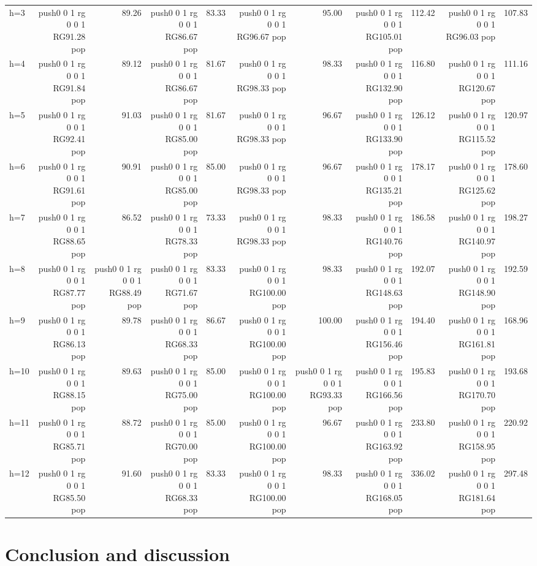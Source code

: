 \documentclass[
  american,
  12pt]{article}
\theoremstyle{plain}
\theoremstyle{plain}
\theoremstyle{remark}
\newcommand{\CPTSadd}[1]{\ifmmode\else\leavevmode\fi\pdfcolorstack 0 push{0 0 1 rg 0 0 1 RG}#1\pdfcolorstack 0 pop}
\begin{document}
\begin{table}
{{\begin{tabular}{lrrrrrrrrrr}
h=3  & \CPTSadd{91.28} & 89.26 & \CPTSadd{86.67} & 83.33 & \CPTSadd{96.67} & 95.00 & \CPTSadd{105.01} & 112.42 & \CPTSadd{96.03} & 107.83 \\
h=4  & \CPTSadd{91.84} & 89.12 & \CPTSadd{86.67} & 81.67 & \CPTSadd{98.33} & 98.33 & \CPTSadd{132.90} & 116.80 & \CPTSadd{120.67} & 111.16 \\
h=5  & \CPTSadd{92.41} & 91.03 & \CPTSadd{85.00} & 81.67 & \CPTSadd{98.33} & 96.67 & \CPTSadd{133.90} & 126.12 & \CPTSadd{115.52} & 120.97 \\
h=6  & \CPTSadd{91.61} & 90.91 & \CPTSadd{85.00} & 85.00 & \CPTSadd{98.33} & 96.67 & \CPTSadd{135.21} & 178.17 & \CPTSadd{125.62} & 178.60 \\
h=7  & \CPTSadd{88.65} & 86.52 & \CPTSadd{78.33} & 73.33 & \CPTSadd{98.33} & 98.33 & \CPTSadd{140.76} & 186.58 & \CPTSadd{140.97} & 198.27 \\
h=8  & \CPTSadd{87.77} & \CPTSadd{88.49} & \CPTSadd{71.67} & 83.33 & \CPTSadd{100.00} & 98.33 & \CPTSadd{148.63} & 192.07 & \CPTSadd{148.90} & 192.59 \\
h=9  & \CPTSadd{86.13} & 89.78 & \CPTSadd{68.33} & 86.67 & \CPTSadd{100.00} & 100.00 & \CPTSadd{156.46} & 194.40 & \CPTSadd{161.81} & 168.96 \\
h=10 & \CPTSadd{88.15} & 89.63 & \CPTSadd{75.00} & 85.00 & \CPTSadd{100.00} & \CPTSadd{93.33} & \CPTSadd{166.56} & 195.83 & \CPTSadd{170.70} & 193.68 \\
h=11 & \CPTSadd{85.71} & 88.72 & \CPTSadd{70.00} & 85.00 & \CPTSadd{100.00} & 96.67 & \CPTSadd{163.92} & 233.80 & \CPTSadd{158.95} & 220.92 \\
h=12 & \CPTSadd{85.50} & 91.60 & \CPTSadd{68.33} & 83.33 & \CPTSadd{100.00} & 98.33 & \CPTSadd{168.05} & 336.02 & \CPTSadd{181.64} & 297.48 \\
\bottomrule
\end{tabular}}

}

\end{table}%

\section{Conclusion and discussion}\label{conclusion-and-discussion}
\end{document}

